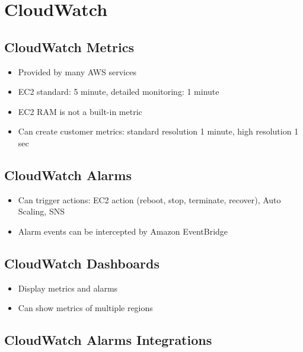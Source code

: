 \section{CloudWatch}

\subsection{CloudWatch Metrics}
\begin{itemize}
    \item Provided by many AWS services
    \item EC2 standard: 5 minute, detailed monitoring: 1 minute
    \item EC2 RAM is not a built-in metric
    \item Can create customer metrics: standard resolution 1 minute, high resolution 1 sec
\end{itemize}

\subsection{CloudWatch Alarms}
\begin{itemize}
    \item Can trigger actions: EC2 action (reboot, stop, terminate, recover), Auto Scaling, SNS
    \item Alarm events can be intercepted by Amazon EventBridge
\end{itemize}

\subsection{CloudWatch Dashboards}
\begin{itemize}
    \item Display metrics and alarms
    \item Can show metrics of multiple regions
\end{itemize}

\subsection{CloudWatch Alarms Integrations}

